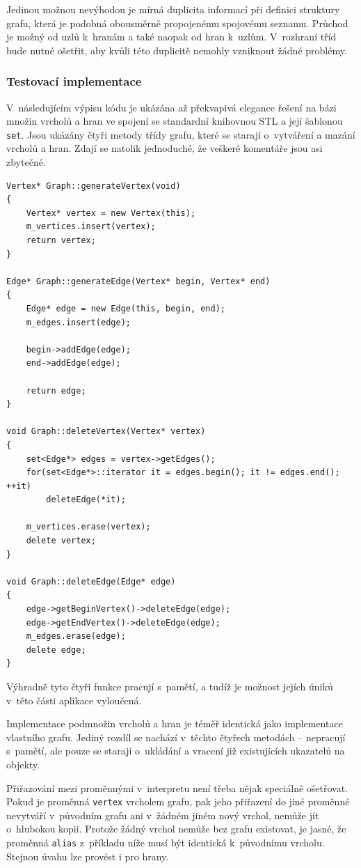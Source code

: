 \documentclass[11pt,twoside,a4paper]{book}
\begin{document}
Jedinou možnou nevýhodou je mírná duplicita informací při definici struktury gra\-fu, která je podobná obousměrně propojenému spojovému seznamu. Průchod je možný od uzlů k~hranám a také naopak od hran k~uzlům. V~rozhraní tříd bude nutné ošetřit, aby kvůli této duplicitě nemohly vzniknout žádné problémy.


\subsubsection{Testovací implementace}

V~následujícím výpisu kódu je ukázána až překvapivá elegance řešení na bázi množin vrcholů a hran ve spojení se standardní knihovnou STL a její šablonou \texttt{set}. Jsou ukázány čtyři metody třídy grafu, které se starají o~vytváření a mazání vrcholů a hran. Zdají se natolik jednoduché, že veškeré komentáře jsou asi zbytečné.

\begin{verbatim}
Vertex* Graph::generateVertex(void)
{
    Vertex* vertex = new Vertex(this);
    m_vertices.insert(vertex);
    return vertex;
}

Edge* Graph::generateEdge(Vertex* begin, Vertex* end)
{
    Edge* edge = new Edge(this, begin, end);
    m_edges.insert(edge);

    begin->addEdge(edge);
    end->addEdge(edge);

    return edge;
}

void Graph::deleteVertex(Vertex* vertex)
{
    set<Edge*> edges = vertex->getEdges();
    for(set<Edge*>::iterator it = edges.begin(); it != edges.end(); ++it)
        deleteEdge(*it);

    m_vertices.erase(vertex);
    delete vertex;
}

void Graph::deleteEdge(Edge* edge)
{
    edge->getBeginVertex()->deleteEdge(edge);
    edge->getEndVertex()->deleteEdge(edge);
    m_edges.erase(edge);
    delete edge;
}
\end{verbatim}

Výhradně tyto čtyři funkce pracují s~pamětí, a tudíž je možnost jejích úniků v~této části aplikace vyloučená.

Implementace podmnožin vrcholů a hran je téměř identická jako implementace vlastního grafu. Jediný rozdíl se nachází v~těchto čtyřech metodách -- nepracují s~pamětí, ale pouze se starají o~ukládání a vracení již existujících ukazatelů na objekty.

Přiřazování mezi proměnnými v~interpretu není třeba nějak speciálně ošetřovat. Pokud je proměnná \texttt{vertex} vrcholem grafu, pak jeho přiřazení do jiné proměnné nevytváří v~původním grafu ani v~žádném jiném nový vrchol, nemůže jít o~hlubokou kopii. Protože žádný vrchol nemůže bez grafu existovat, je jasné, že proměnná \texttt{alias} z~příkladu níže musí být identická k~původnímu vrcholu. Stejnou úvahu lze provést i pro hrany.
\end{document}
